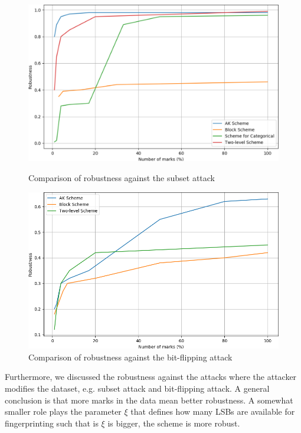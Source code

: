 \begin{figure}
    \centering
    \begin{minipage}{0.49\textwidth}{
        \includegraphics[width=\textwidth]{Figures/subset-screensh.PNG}
        \caption{Comparison of robustness against the subset attack}
        \label{fig:subset-attack}
    }\end{minipage}\hfill
    \begin{minipage}{0.49\textwidth}
        \centering
        \includegraphics[width=\textwidth]{Figures/bit-flipping.PNG}
        \caption{Comparison of robustness against the bit-flipping attack}
        \label{fig:bit-flipping-attack}
    \end{minipage}
\end{figure}
Furthermore, we discussed the robustness against the attacks where the attacker modifies the dataset, e.g. subset attack and bit-flipping attack. A general conclusion is that more marks in the data mean better robustness. A somewhat smaller role plays the parameter $\xi$ that defines how many LSBs are available for fingerprinting such that is $\xi$ is bigger, the scheme is more robust. 
